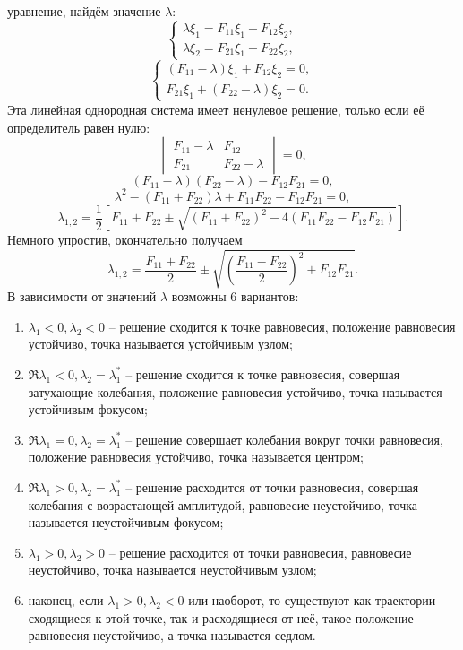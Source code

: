 уравнение, найдём значение \( \lambda \):
\[
    \left\{
        \begin{array}{l}
            \lambda\xi_1 = F_{11}\xi_1 + F_{12}\xi_2,\\
            \lambda\xi_2 = F_{21}\xi_1 + F_{22}\xi_2,
        \end{array}
    \right.
\]
\[
    \left\{
        \begin{array}{l}
            (F_{11} - \lambda) \xi_1 + F_{12}\xi_2 = 0,\\
            F_{21}\xi_1 + (F_{22} - \lambda) \xi_2 = 0.
        \end{array}
    \right.
\]
Эта линейная однородная система имеет ненулевое решение, только если её
определитель равен нулю:
\[
    \begin{vmatrix}
        F_{11} - \lambda & F_{12}          \\
        F_{21}           & F_{22} - \lambda
    \end{vmatrix}
    = 0,
\]
\[
    (F_{11} - \lambda)(F_{22} - \lambda) - F_{12}F_{21} = 0,
\]
\[
    \lambda^2 - (F_{11} + F_{22}) \lambda + F_{11}F_{22} - F_{12}F_{21} = 0,
\]
\[
    \lambda_{1,2} = \frac{1}{2}\left[ F_{11} + F_{22} \pm
        \sqrt{(F_{11} + F_{22})^2 - 4(F_{11}F_{22} - F_{12}F_{21})} \right].
\]
Немного упростив, окончательно получаем
\[
    \lambda_{1,2} = \frac{F_{11} + F_{22}}{2} \pm
        \sqrt{\left(\frac{F_{11} - F_{22}}{2}\right)^2 + F_{12}F_{21}}.
\]
В зависимости от значений \( \lambda \) возможны 6 вариантов:
\begin{enumerate}
    \item \( \lambda_1 < 0, \lambda_2 < 0 \) -- решение сходится к точке
        равновесия, положение равновесия устойчиво, точка называется устойчивым
        узлом;
    \item \( \Re\lambda_1 < 0, \lambda_2 = \lambda_1^* \) -- решение сходится к
        точке равновесия, совершая затухающие колебания, положение равновесия
        устойчиво, точка называется устойчивым фокусом;
    \item \( \Re\lambda_1 = 0, \lambda_2 = \lambda_1^* \) -- решение совершает
        колебания вокруг точки равновесия, положение равновесия устойчиво, точка
        называется центром;
    \item \( \Re\lambda_1 > 0, \lambda_2 = \lambda_1^* \) -- решение расходится
        от точки равновесия, совершая колебания с возрастающей амплитудой,
        равновесие неустойчиво, точка называется неустойчивым фокусом;
    \item \( \lambda_1 > 0, \lambda_2 > 0 \) -- решение расходится от точки
        равновесия, равновесие неустойчиво, точка называется неустойчивым узлом;
    \item наконец, если \( \lambda_1 > 0, \lambda_2 < 0 \) или наоборот, то
        существуют как траектории сходящиеся к этой точке, так и расходящиеся от
        неё, такое положение равновесия неустойчиво, а точка называется седлом.
\end{enumerate}

